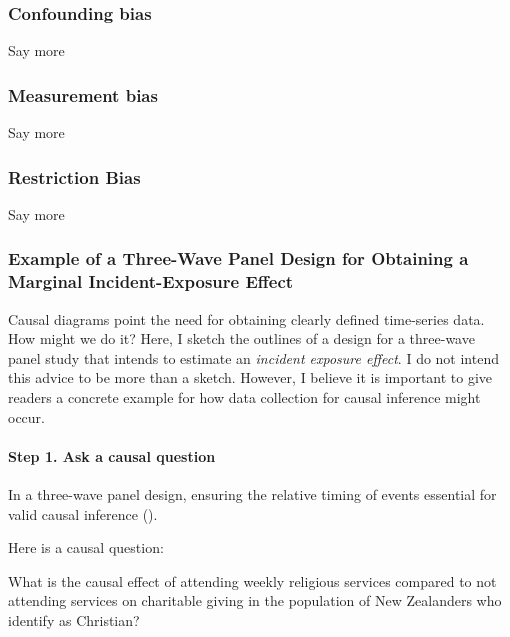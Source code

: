 \documentclass[
  singlecolumn]{article}
\let\oldparagraph\paragraph
\renewcommand{\paragraph}[1]{\oldparagraph{#1}\mbox{}}
\begin{document}
\subsubsection{Confounding bias}\label{confounding-bias}

Say more

\subsubsection{Measurement bias}\label{measurement-bias}

Say more

\subsubsection{Restriction Bias}\label{restriction-bias}

Say more

\subsubsection{Example of a Three-Wave Panel Design for Obtaining a
Marginal Incident-Exposure
Effect}\label{example-of-a-three-wave-panel-design-for-obtaining-a-marginal-incident-exposure-effect}

Causal diagrams point the need for obtaining clearly defined time-series
data. How might we do it? Here, I sketch the outlines of a design for a
three-wave panel study that intends to estimate an \emph{incident
exposure effect}. I do not intend this advice to be more than a sketch.
However, I believe it is important to give readers a concrete example
for how data collection for causal inference might occur.

\paragraph{Step 1. Ask a causal
question}\label{step-1.-ask-a-causal-question}

In a three-wave panel design, ensuring the relative timing of events
essential for valid causal inference
().

Here is a causal question:

What is the causal effect of attending weekly religious services
compared to not attending services on charitable giving in the
population of New Zealanders who identify as Christian?
\end{document}

